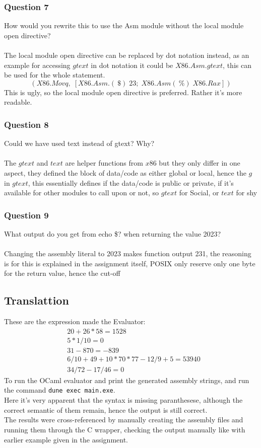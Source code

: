 \documentclass[12pt]{article}
\begin{document}
\subsubsection*{Question 7}
How would you rewrite this to use the Asm module without the local module open directive?\\\\
The local module open directive can be replaced by dot notation instead, as an example for accessing $gtext$ in dot notation it could be
$X86.Asm.gtext$, this can be used for the whole statement.
\[
(X86.Movq,\; [X86.Asm.(~\$)\; 23; \; X86.Asm(~\%) \; X86.Rax])
\]
This is ugly, so the local module open directive is preferred. Rather it's more readable.
\subsubsection*{Question 8}
Could we have used text instead of gtext? Why?\\\\
The $gtext$ and $text$ are helper functions from $x86$ but they only differ in one aspect,
 they defined the block of data/code as either global or local, hence the $g$ in $gtext$, this essentially 
 defines if the data/code is public or private, if it's available for other modules to call upon or not, so $gtext$ for Social, or $text$ for shy
\subsubsection*{Question 9}
What output do you get from echo \$? when returning the value 2023?\\\\
Changing the assembly literal to 2023 makes function output 231, the reasoning is for this is explained in the assignment itself, POSIX only reserve only one byte for the return value, hence the cut-off  

\subsection*{Translattion}
These are the expression made the Evaluator:
\begin{align}
&20 + 26 * 58 = 1528 \\
&5 * 1 / 10 = 0\\
&31 - 870 = -839\\
&6 / 10 + 49 + 10 * 70 * 77 - 12 / 9 + 5 = 53940\\
&34 / 72 - 17 / 46 = 0
\end{align}
To run the OCaml evaluator and print the generated assembly strings, and run the command \texttt{dune exec main.exe}.\\
Here it's very apparent that the syntax is missing paranthesese, although the correct semantic of them remain, hence the output is still correct.\\
The results were cross-referenced by manually creating the assembly files and running them through the C wrapper, checking the output manually like with earlier example given in the assignment.
\end{document}
